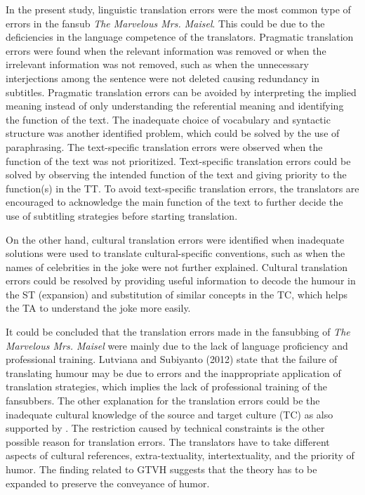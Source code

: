 \documentclass[english]{textolivre}
\begin{document}
In the present study, linguistic translation errors were the most common type of errors in the fansub \textit{The Marvelous Mrs. Maisel}. This could be due to the deficiencies in the language competence of the translators. Pragmatic translation errors were found when the relevant information was removed or when the irrelevant information was not removed, such as when the unnecessary interjections among the sentence were not deleted causing redundancy in subtitles. Pragmatic translation errors can be avoided by interpreting the implied meaning instead of only understanding the referential meaning and identifying the function of the text. The inadequate choice of vocabulary and syntactic structure was another identified problem, which could be solved by the use of paraphrasing. The text-specific translation errors were observed when the function of the text was not prioritized. Text-specific translation errors could be solved by observing the intended function of the text and giving priority to the function(s) in the TT. To avoid text-specific translation errors, the translators are encouraged to acknowledge the main function of the text to further decide the use of subtitling strategies before starting translation.  

On the other hand, cultural translation errors were identified when inadequate solutions were used to translate cultural-specific conventions, such as when the names of celebrities in the joke were not further explained. Cultural translation errors could be resolved by providing useful information to decode the humour in the ST (expansion) and substitution of similar concepts in the TC, which helps the TA to understand the joke more easily. 

It could be concluded that the translation errors made in the fansubbing of \textit{The Marvelous Mrs. Maisel} were mainly due to the lack of language proficiency and professional training. Lutviana and Subiyanto (2012) state that the failure of translating humour may be due to errors and the inappropriate application of translation strategies, which implies the lack of professional training of the fansubbers. The other explanation for the translation errors could be the inadequate cultural knowledge of the source and target culture (TC) as also supported by \textcite{kianbakht_audiovisual_2015}. The restriction caused by technical constraints is the other possible reason for translation errors. The translators have to take different aspects of cultural references, extra-textuality, intertextuality, and the priority of humor. The finding related to GTVH suggests that the theory has to be expanded to preserve the conveyance of humor. 
\end{document}
